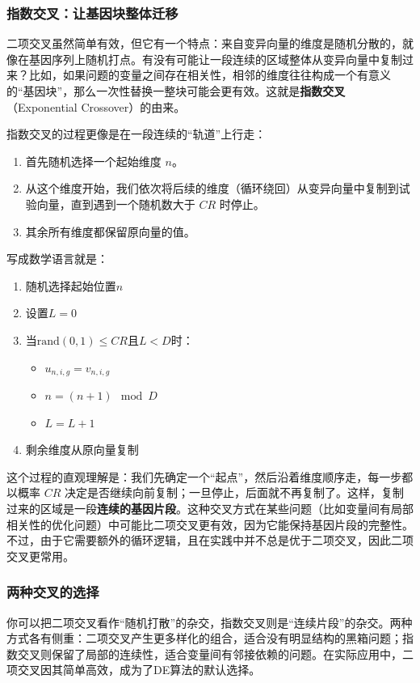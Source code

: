 \documentclass[lang=cn,zihao=-4,a4paper,fontset=windows]{beautybook}
\begin{document}
\subsubsection{指数交叉：让基因块整体迁移}

二项交叉虽然简单有效，但它有一个特点：来自变异向量的维度是随机分散的，就像在基因序列上随机打点。有没有可能让一段连续的区域整体从变异向量中复制过来？比如，如果问题的变量之间存在相关性，相邻的维度往往构成一个有意义的“基因块”，那么一次性替换一整块可能会更有效。这就是\textbf{指数交叉}（Exponential Crossover）的由来。

指数交叉的过程更像是在一段连续的“轨道”上行走：
\begin{enumerate}
    \item 首先随机选择一个起始维度 \(n\)。
    \item 从这个维度开始，我们依次将后续的维度（循环绕回）从变异向量中复制到试验向量，直到遇到一个随机数大于 \(CR\) 时停止。
    \item 其余所有维度都保留原向量的值。
\end{enumerate}
写成数学语言就是：
\begin{enumerate}
    \item 随机选择起始位置$n$
    \item 设置$L = 0$
    \item 当$\text{rand}(0,1) \leq CR$且$L < D$时：
    \begin{itemize}
        \item $u_{n,i,g} = v_{n,i,g}$
        \item $n = (n+1) \mod D$
        \item $L = L + 1$
    \end{itemize}
    \item 剩余维度从原向量复制
\end{enumerate}
这个过程的直观理解是：我们先确定一个“起点”，然后沿着维度顺序走，每一步都以概率 \(CR\) 决定是否继续向前复制；一旦停止，后面就不再复制了。这样，复制过来的区域是一段\textbf{连续的基因片段}。这种交叉方式在某些问题（比如变量间有局部相关性的优化问题）中可能比二项交叉更有效，因为它能保持基因片段的完整性。不过，由于它需要额外的循环逻辑，且在实践中并不总是优于二项交叉，因此二项交叉更常用。

\subsubsection{两种交叉的选择}

你可以把二项交叉看作“随机打散”的杂交，指数交叉则是“连续片段”的杂交。两种方式各有侧重：二项交叉产生更多样化的组合，适合没有明显结构的黑箱问题；指数交叉则保留了局部的连续性，适合变量间有邻接依赖的问题。在实际应用中，二项交叉因其简单高效，成为了DE算法的默认选择。
\end{document}
